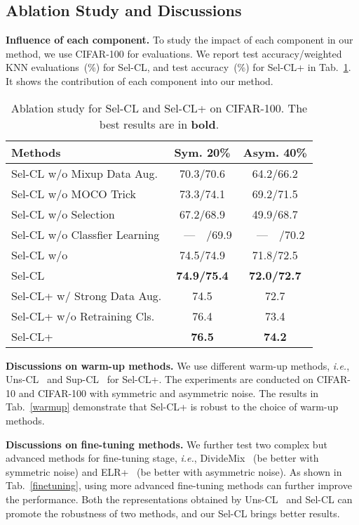\documentclass[10pt,twocolumn,letterpaper]{article}
\newcommand{\myPara}[1]{\vspace{.05in}\noindent\textbf{#1}}
\begin{document}
\subsection{Ablation Study and Discussions} \label{sec:4.6}
\vspace{-2pt}
\myPara{Influence of each component.}
To study the impact of each component in our method, we use CIFAR-100 for evaluations. We report test accuracy/weighted KNN evaluations~(\%) for Sel-CL, and test accuracy~(\%) for Sel-CL+ in Tab.~\ref{ablation}. It shows the contribution of each component into our method. 
\begin{table}[t]		
	\caption{Ablation study for Sel-CL and Sel-CL+ on CIFAR-100. The best results are in \textbf{bold}.}\vspace{-5pt}
	\centering
	\small
	\begin{tabular}{l|c|c}
		\hline \multirow{1}{*}{Methods}  &\multicolumn{1}{c}{ Sym. 20\%} & \multicolumn{1}{|c}{Asym. 40\%} \\
		\hline
		Sel-CL w/o Mixup Data Aug. & 70.3/70.6 & 64.2/66.2  \\
		Sel-CL w/o MOCO Trick & 73.3/74.1 &  69.2/71.5 \\
		Sel-CL w/o Selection  & 67.2/68.9 & 49.9/68.7  \\		
Sel-CL w/o Classfier Learning & ~~---~~/69.9\quad & ~~---~~/70.2\quad \\		
		Sel-CL w/o   & 74.5/74.9 & 71.8/72.5  \\
		Sel-CL & \textbf{74.9/75.4} & \textbf{72.0/72.7}  \\
		\hline
		Sel-CL+ w/ Strong Data Aug. & 74.5 & 72.7  \\
		Sel-CL+ w/o Retraining Cls. & 76.4 & 73.4  \\
		Sel-CL+ & \textbf{76.5} & \textbf{74.2} \\				
		\hline
	\end{tabular}
    \label{ablation}
   \vspace{-6pt}
\end{table}

\myPara{Discussions on warm-up methods.} We use different warm-up methods, \textit{i.e.}, Uns-CL~\cite{chen2020simple} and Sup-CL~\cite{Khosla2020} for Sel-CL+. The experiments are conducted on CIFAR-10 and CIFAR-100 with symmetric and asymmetric noise. The results in Tab.~\ref{warmup} demonstrate that Sel-CL+ is robust to the choice of warm-up methods.

\myPara{Discussions on fine-tuning methods.}
We further test two complex but advanced methods for fine-tuning stage, \textit{i.e.}, DivideMix~\cite{LiSH20} (be better with symmetric noise) and ELR+~\cite{LiuNRF20} (be better with asymmetric noise). As shown in Tab.~\ref{finetuning}, using more advanced fine-tuning methods can further improve the performance. Both the representations obtained by Uns-CL~\cite{chen2020simple} and Sel-CL can promote the robustness of two methods, and our Sel-CL brings better results. 
\end{document}
